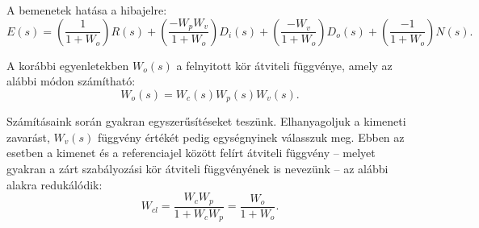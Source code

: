 A bemenetek hatása a hibajelre:
\begin{equation}
  E(s)
  = \left( \frac{1}       {1 + W_o} \right) R(s)
  + \left( \frac{-W_p W_v}{1 + W_o} \right) D_i(s)
  + \left( \frac{-W_v}    {1 + W_o} \right) D_o(s)
  + \left( \frac{-1}      {1 + W_o} \right) N(s)
  .
  \label{eq:disturbances-E}
\end{equation}

A korábbi egyenletekben $W_o(s)$ a felnyitott kör átviteli függvénye, amely
az alábbi módon számítható:
\begin{equation}
  W_o(s) = W_c(s) W_p(s) W_v(s)
  .
  \label{eq:disturbances-o}
\end{equation}

Számításaink során gyakran egyszerűsítéseket teszünk. Elhanyagoljuk a kimeneti
zavarást, $W_v(s)$ függvény értékét pedig egységnyinek válasszuk meg.
Ebben az esetben a kimenet és a referenciajel között felírt átviteli függvény --
melyet gyakran a zárt szabályozási kör átviteli függvényének is nevezünk --
az alábbi alakra redukálódik:
\begin{equation}
  W_{cl}
  = \frac{W_c W_p}{1 + W_c W_p}
  = \frac{W_o}{1 + W_o}
  .
  \label{eq:disturbances-cl}
\end{equation}
